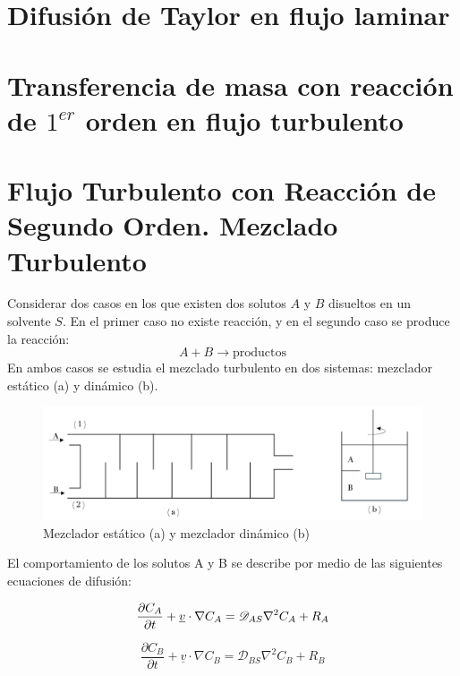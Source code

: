 \section{Difusión de Taylor en flujo laminar}
\section{Transferencia de masa con reacción de $1^{er}$ orden en flujo turbulento}


\section{Flujo Turbulento con Reacción de Segundo Orden. Mezclado Turbulento}

Considerar dos casos en los que existen dos solutos $A$ y $B$ disueltos en un solvente $S$. En el primer caso no existe reacción, y en el segundo caso se produce la reacción:
\begin{equation*}
    A + B \rightarrow \text{productos}
\end{equation*}
En ambos casos se estudia el mezclado turbulento en dos sistemas: mezclador estático (a) y dinámico (b).

\begin{figure}[h]

        \includegraphics[width=\linewidth]{Capitulo3/Imagenes/Fig_3.8.png}
        \caption{Mezclador estático (a) y mezclador dinámico (b)}
        \label{fig:Fig_3.8}

\end{figure}
        El comportamiento de los solutos A y B se describe por medio de las siguientes ecuaciones de difusión:




\begin{equation}
    \frac{\partial C_A}{\partial t} + \underline{v} \cdot \nabla C_A = \mathscr{D}_{AS} \nabla^2 C_A + R_A
    \notag
\end{equation}

\begin{equation}
    \frac{\partial C_B}{\partial t} + \underline{v} \cdot \nabla C_B = \mathscr{D}_{BS} \nabla^2 C_B + R_B
    \label{eq_3.82}
\end{equation}





